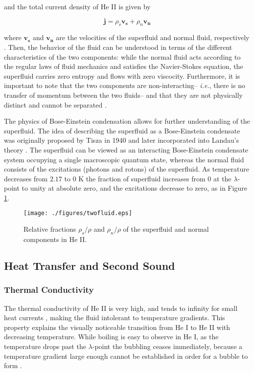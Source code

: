 and the total current density of He II is given by

\begin{equation}
\mathbf{j} = \rho_s\mathbf{v_s} + \rho_n\mathbf{v_n}
\end{equation}

where $\mathbf{v_s}$ and $\mathbf{v_n}$ are the velocities of the
superfluid and normal fluid, respectively \cite{tilley}. Then, the
behavior of the fluid can be understood in terms of the different
characteristics of the two components: while the normal fluid acts
according to the regular laws of fluid mechanics and satisfies the
Navier-Stokes equation, the superfluid carries zero entropy and flows
with zero viscocity. Furthermore, it is important to note that the two
components are non-interacting-- \emph{i.e.}, there is no transfer of
momentum between the two fluids-- and that they are
not physically distinct and cannot be separated \cite{tilley}.

The physics of Bose-Einstein condensation allows for further understanding of the superfluid. The
idea of describing the superfluid as a Bose-Einstein condensate was
originally proposed by Tisza in 1940 and later incorporated into
Landau's theory \cite{tisza}. The superfluid can be viewed as an
interacting Bose-Einstein condensate system occupying a single
macroscopic quantum state, whereas the normal fluid consists of the
excitations (photons and rotons) of the superfluid. As temperature
decreases from $2.17$ to $0$ K the fraction of superfluid increases
from $0$ at the $\lambda$-point to unity at absolute zero, and the
excitations decrease to zero, as in Figure \ref{figure:twofluid}.


\begin{figure}[ht]
\begin{center}
\texttt{[image: ./figures/twofluid.eps]}
\caption{\small{Relative fractions $\rho_s/\rho$ and $\rho_n/\rho$ of
   the superfluid and normal components in He II.}}
\label{figure:twofluid}
\end{center}
\end{figure}



\subsection{Heat Transfer and Second Sound}\label{heattransferandsecondsound}

\subsubsection{Thermal Conductivity}\label{thermalconductivity}
The thermal conductivity of He II is very high, and tends to infinity
for small heat currents \cite{tilley}, making the fluid intolerant
to temperature gradients. This property explains the visually
noticeable transition from He I to He II with decreasing temperature.
While boiling is easy to observe in He I, as the temperature drops
past the $\lambda$-point the bubbling ceases immediately, because a
temperature gradient large enough cannot be established in order for a
bubble to form \cite{tilley}.


